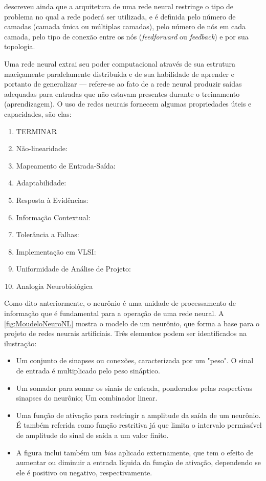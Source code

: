  descreveu ainda que a arquitetura de uma rede neural restringe o tipo de problema no qual a rede poderá ser utilizada, e é definida pelo número de camadas (camada única ou múltiplas camadas), pelo número de nós em cada camada, pelo tipo de conexão entre os nós (\textit{feedforward} ou \textit{feedback}) e por sua topologia.

Uma rede neural extrai seu poder computacional através de sua estrutura maciçamente paralelamente distribuída e de sua habilidade de aprender e portanto de generalizar --- refere-se ao fato de a rede neural produzir saídas adequadas para entradas que não estavam presentes durante o treinamento (aprendizagem). O uso de redes neurais fornecem algumas propriedades úteis e capacidades, são elas:

    \begin{enumerate}
        \item {\color{red} TERMINAR}
        \item Não-linearidade:
        \item Mapeamento de Entrada-Saída:
        \item Adaptabilidade:
        \item Resposta à Evidências:
        \item Informação Contextual:
        \item Tolerância a Falhas:
        \item Implementação em VLSI:
        \item Uniformidade de Análise de Projeto:
        \item Analogia Neurobiológica
    \end{enumerate}
    
    Como dito anteriormente, o neurônio é uma unidade de processamento de informação que é fundamental para a operação de uma rede neural. A \autoref{fig:MoudeloNeuroNL} mostra o modelo de um neurônio, que forma a base para o projeto de redes neurais artificiais. Três elementos podem ser identificados na ilustração:
    \begin{itemize}
        \item Um conjunto de sinapses ou conexões, caracterizada por um "peso". O sinal de entrada é multiplicado pelo peso sináptico.
        \item Um somador para somar os sinais de entrada, ponderados pelas respectivas sinapses do neurônio; Um combinador linear.
        \item Uma função de ativação para restringir a amplitude da saída de um neurônio. É também referida como função restritiva já que limita o intervalo permissível de amplitude do sinal de saída a um valor finito.
        \item A figura inclui também um \textit{bias} aplicado externamente, que tem o efeito de aumentar ou diminuir a entrada líquida da função de ativação, dependendo se ele é positivo ou negativo, respectivamente. 
    \end{itemize}
    
